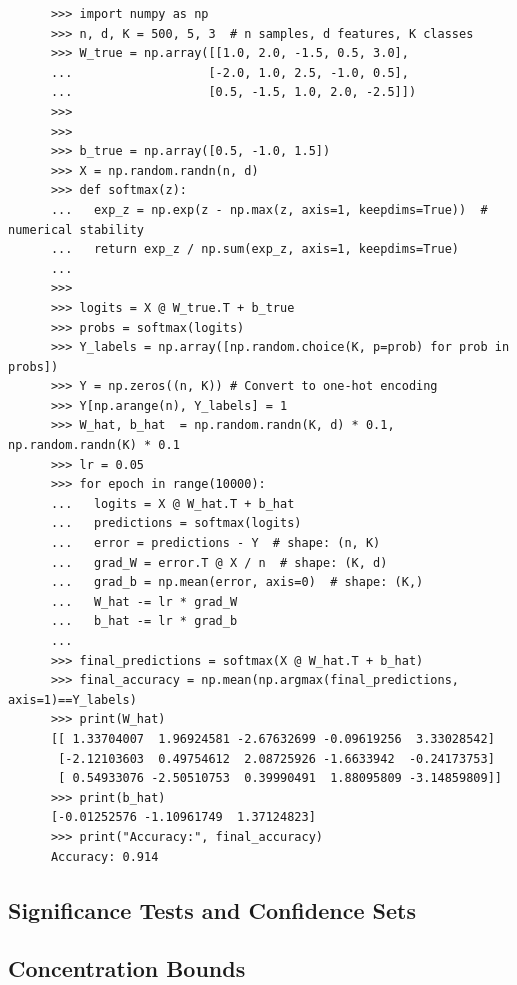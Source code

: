   \begin{example}
    \label{ex:sgd-from-scratch-2}
    \begin{lstlisting}
      >>> import numpy as np
      >>> n, d, K = 500, 5, 3  # n samples, d features, K classes
      >>> W_true = np.array([[1.0, 2.0, -1.5, 0.5, 3.0],
      ...                   [-2.0, 1.0, 2.5, -1.0, 0.5],
      ...                   [0.5, -1.5, 1.0, 2.0, -2.5]])
      >>> 
      >>> 
      >>> b_true = np.array([0.5, -1.0, 1.5])
      >>> X = np.random.randn(n, d)
      >>> def softmax(z):
      ...   exp_z = np.exp(z - np.max(z, axis=1, keepdims=True))  # numerical stability
      ...   return exp_z / np.sum(exp_z, axis=1, keepdims=True)
      ... 
      >>> 
      >>> logits = X @ W_true.T + b_true
      >>> probs = softmax(logits)
      >>> Y_labels = np.array([np.random.choice(K, p=prob) for prob in probs])
      >>> Y = np.zeros((n, K)) # Convert to one-hot encoding
      >>> Y[np.arange(n), Y_labels] = 1
      >>> W_hat, b_hat  = np.random.randn(K, d) * 0.1, np.random.randn(K) * 0.1
      >>> lr = 0.05
      >>> for epoch in range(10000):
      ...   logits = X @ W_hat.T + b_hat
      ...   predictions = softmax(logits)
      ...   error = predictions - Y  # shape: (n, K)
      ...   grad_W = error.T @ X / n  # shape: (K, d)
      ...   grad_b = np.mean(error, axis=0)  # shape: (K,)
      ...   W_hat -= lr * grad_W
      ...   b_hat -= lr * grad_b
      ... 
      >>> final_predictions = softmax(X @ W_hat.T + b_hat)
      >>> final_accuracy = np.mean(np.argmax(final_predictions, axis=1)==Y_labels)
      >>> print(W_hat)
      [[ 1.33704007  1.96924581 -2.67632699 -0.09619256  3.33028542]
       [-2.12103603  0.49754612  2.08725926 -1.6633942  -0.24173753]
       [ 0.54933076 -2.50510753  0.39990491  1.88095809 -3.14859809]]
      >>> print(b_hat)
      [-0.01252576 -1.10961749  1.37124823]
      >>> print("Accuracy:", final_accuracy)
      Accuracy: 0.914
    \end{lstlisting}
  \end{example}

\subsection{Significance Tests and Confidence Sets}

\subsection{Concentration Bounds}

